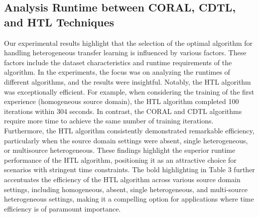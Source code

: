 \subsection{Analysis Runtime between CORAL, CDTL, and HTL Techniques}
Our experimental results highlight that the selection of the optimal algorithm for handling heterogeneous transfer learning is influenced by various factors. These factors include the dataset characteristics and runtime requirements of the algorithm. In the experiments, the focus was on analyzing the runtimes of different algorithms, and the results were insightful. Notably, the HTL algorithm was exceptionally efficient. For example, when considering the training of the first experience (homogeneous source domain), the HTL algorithm completed 100 iterations within 304 seconds. In contrast, the CORAL and CDTL algorithms require more time to achieve the same number of training iterations. Furthermore, the HTL algorithm consistently demonstrated remarkable efficiency, particularly when the source domain settings were absent, single heterogeneous, or multisource heterogeneous. These findings highlight the superior runtime performance of the HTL algorithm, positioning it as an attractive choice for scenarios with stringent time constraints. The bold highlighting in Table 3 further accentuates the efficiency of the HTL algorithm across various source domain settings, including homogeneous, absent, single heterogeneous, and multi-source heterogeneous settings, making it a compelling option for applications where time efficiency is of paramount importance.

\begin{table}[H]
  \centering
  \caption{Runtimes (in seconds) for CORAL, CDTL, and HTL.}
  \label{table:6_table3}
  \end{table}

